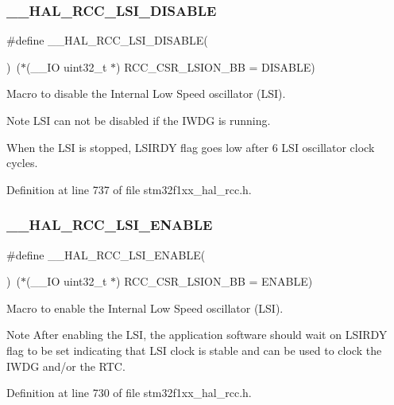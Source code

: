 \subsubsection{\texorpdfstring{\+\_\+\+\_\+\+H\+A\+L\+\_\+\+R\+C\+C\+\_\+\+L\+S\+I\+\_\+\+D\+I\+S\+A\+B\+LE}{\_\_HAL\_RCC\_LSI\_DISABLE}}
{\footnotesize\ttfamily \#define \+\_\+\+\_\+\+H\+A\+L\+\_\+\+R\+C\+C\+\_\+\+L\+S\+I\+\_\+\+D\+I\+S\+A\+B\+LE(\begin{DoxyParamCaption}{ }\end{DoxyParamCaption})~($\ast$(\+\_\+\+\_\+\+IO uint32\+\_\+t $\ast$) R\+C\+C\+\_\+\+C\+S\+R\+\_\+\+L\+S\+I\+O\+N\+\_\+\+BB = D\+I\+S\+A\+B\+LE)}



Macro to disable the Internal Low Speed oscillator (L\+SI). 

\begin{DoxyNote}{Note}
L\+SI can not be disabled if the I\+W\+DG is running. 

When the L\+SI is stopped, L\+S\+I\+R\+DY flag goes low after 6 L\+SI oscillator clock cycles. 
\end{DoxyNote}


Definition at line 737 of file stm32f1xx\+\_\+hal\+\_\+rcc.\+h.

\mbox{\label{group___r_c_c___l_s_i___configuration_ga560de8b8991db4a296de878a7a8aa58b}} 
\subsubsection{\texorpdfstring{\+\_\+\+\_\+\+H\+A\+L\+\_\+\+R\+C\+C\+\_\+\+L\+S\+I\+\_\+\+E\+N\+A\+B\+LE}{\_\_HAL\_RCC\_LSI\_ENABLE}}
{\footnotesize\ttfamily \#define \+\_\+\+\_\+\+H\+A\+L\+\_\+\+R\+C\+C\+\_\+\+L\+S\+I\+\_\+\+E\+N\+A\+B\+LE(\begin{DoxyParamCaption}{ }\end{DoxyParamCaption})~($\ast$(\+\_\+\+\_\+\+IO uint32\+\_\+t $\ast$) R\+C\+C\+\_\+\+C\+S\+R\+\_\+\+L\+S\+I\+O\+N\+\_\+\+BB = E\+N\+A\+B\+LE)}



Macro to enable the Internal Low Speed oscillator (L\+SI). 

\begin{DoxyNote}{Note}
After enabling the L\+SI, the application software should wait on L\+S\+I\+R\+DY flag to be set indicating that L\+SI clock is stable and can be used to clock the I\+W\+DG and/or the R\+TC. 
\end{DoxyNote}


Definition at line 730 of file stm32f1xx\+\_\+hal\+\_\+rcc.\+h.


